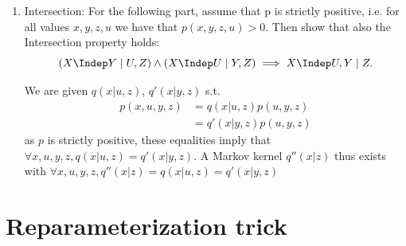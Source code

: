 \begin{gradedsolution}
\begin{enumerate}
\item Intersection: For the following part, assume that p is strictly positive, i.e. for all values $x,y,z,u$ we have that $p(x, y, z, u) > 0$. Then show that also the Intersection property holds:
$$(X \Indep Y \;|\;U,Z) \land (X \Indep U \; | \; Y,Z)  \implies  X \Indep U,Y \; | \; Z.$$

We are given $q(x|u,z)$, $q'(x|y,z)$ s.t.
\begin{align*}
p(x, u, y, z)&=q(x|u,z)p(u, y, z)\\
&=q'(x|y,z)p(u,y, z)
\end{align*}
as $p$ is strictly positive, these equalities imply that $\forall x, u, y, z, q(x|u,z)=q'(x|y,z)$. A Markov kernel $q''(x|z)$ thus exists with $\forall x,u,y,z, q''(x|z)=q(x|u,z)=q'(x|y,z)$
\end{enumerate}
\end{gradedsolution}

\section{Reparameterization trick}

